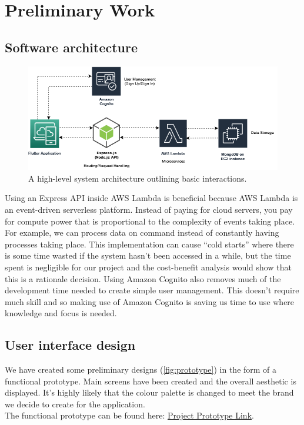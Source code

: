 \chapter{Preliminary Work}
\label{chap:preliminary-work}
\vspace{-10mm}
\section{Software architecture}
\label{sec:architecture}
\begin{figure}[H]
    \centering
    \includegraphics[width=\textwidth]{graphics/project-architecture.png}
    \caption{A high-level system architecture outlining basic interactions.}
    \label{fig:architecture-diagram}
\end{figure}
\vspace{-5mm}
Using an Express API inside AWS Lambda is beneficial because
AWS Lambda is an event-driven serverless platform. Instead of paying for cloud servers, you pay for compute power
that is proportional to the complexity of events taking place. For example,
we can process data on command instead of constantly having processes taking place.
This implementation can cause ``cold starts'' where there is some time wasted if the system hasn't been accessed
in a while, but the time spent is negligible for our project and the cost-benefit analysis would show
that this is a rationale decision. Using Amazon Cognito also removes much of the development
time needed to create simple user management. This doesn't require much skill and so making use of 
Amazon Cognito is saving us time to use where knowledge and focus is needed.
\pagebreak

\section{User interface design}
\label{sec:UI-design}
\vspace{-3mm}
We have created some preliminary designs (\cref{fig:prototype}) in the form of a functional prototype.
Main screens have been created and the overall aesthetic is displayed.
It's highly likely that the colour palette is changed to meet the brand
we decide to create for the application.\\
The functional prototype can be found here: \href{https://www.figma.com/proto/aANVZK2JZcBTPZCzaFYvbm/Final-Year-Project-Prototype?scaling=scale-down&page-id=0%3A1&starting-point-node-id=0%3A3&node-id=0%3A3}{Project Prototype Link}.
\vspace{-2mm}

